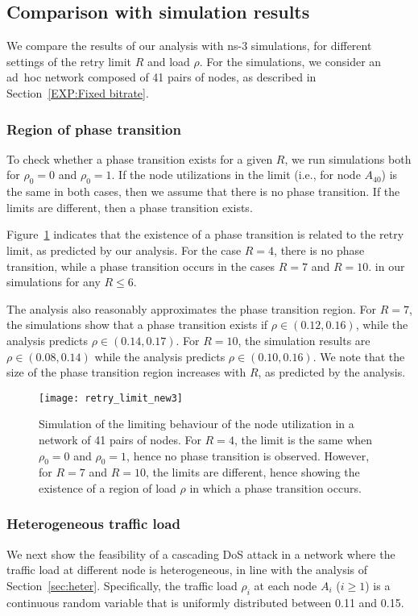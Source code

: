 \documentclass{IEEEtran}
\begin{document}
\subsection{Comparison with simulation results}
\label{Mitigation}
We compare the results of our analysis with ns-3 simulations, for different settings of the retry limit $R$ and load $\rho$. For the simulations, we
consider an ad~hoc network composed of 41 pairs of nodes, as described in Section~\ref{EXP:Fixed bitrate}. 


\subsubsection{Region of phase transition}
\label{validation of Region of phase transition}
To check whether a phase transition exists for a given $R$, we run simulations both for $\rho_0 =0$ and $\rho_0 = 1$. If the node utilizations in
the limit (i.e., for node $A_{40}$) is the same in both cases, then we assume that there is no phase transition. If the limits are different, then a
phase transition exists.

Figure~\ref{retry_limit} indicates that the existence of a phase transition is related to the retry limit, as predicted by our analysis. For the
case $R=4$, there is no phase transition, while a phase transition occurs in the cases $R=7$ and $R=10$. in our simulations for any $R \leq 6$.

The analysis also reasonably approximates the phase transition region. For $R=7$, the simulations show that a phase transition exists if $\rho \in
(0.12,0.16)$, while the analysis predicts $\rho \in (0.14, 0.17)$. For $R=10$, the simulation results are $\rho \in (0.08, 0.14)$ while the analysis
predicts $\rho \in (0.10, 0.16)$. We note that the size of the phase transition region increases with $R$, as predicted by the analysis.

\begin{figure}[!t]
\centering
\texttt{[image: retry\_limit\_new3]}
\caption{Simulation of the limiting behaviour of the node utilization in a network of 41 pairs of nodes. For $R=4$, the limit is the same when
$\rho_0 = 0 $ and $\rho_0 = 1$, hence no phase transition is observed. However, for $R=7$ and $R=10$,
the limits are different, hence showing the existence of a region of load $\rho$ in which a phase transition occurs. }
\label{retry_limit}
\end{figure}


\subsubsection{Heterogeneous traffic load}
\label{validation of Heterogeneous traffic load}
We next show the feasibility of a cascading DoS attack in
a network where the traffic load at different node is heterogeneous, in line with the analysis of Section~\ref{sec:heter}. 
Specifically,  the traffic load $\rho_i$ at each node $A_i$  ($i \geq 1$) is a continuous random variable that is uniformly distributed between 0.11 and
0.15.
\end{document}
